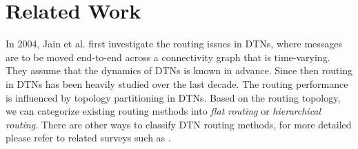\documentclass[conference]{IEEEtran}
\begin{document}
%



\section{Related Work}
\label{Section2_relatedwork}


In 2004, Jain et al. \cite{JainFall-771} first investigate the routing issues in DTNs, where messages are to be moved
end-to-end across a connectivity graph that is time-varying.  They assume that the dynamics of DTNs is known in advance.
Since then routing in DTNs has been heavily studied \cite{cao2013routing,ZXSW13-DTN-survey} over the last decade.
The routing performance is influenced by topology partitioning in DTNs. Based on the routing topology, we can categorize
existing routing methods into \emph{flat routing} or \emph{hierarchical routing}. There are other ways to classify DTN routing methods, for more detailed please refer to related surveys such as \cite{cao2013routing,ZXSW13-DTN-survey}.
\end{document}
